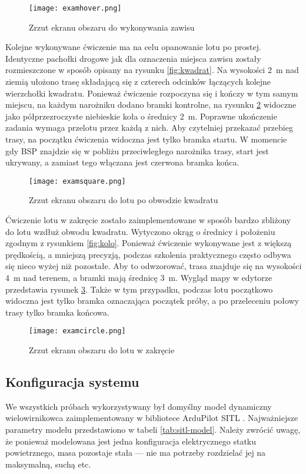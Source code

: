 \begin{figure}[!h]
    \centering \texttt{[image: examhover.png]}
    \caption{Zrzut ekranu obszaru do wykonywania zawisu}
    \label{fig:examhover}
\end{figure}

Kolejne wykonywane ćwiczenie ma na celu opanowanie lotu po prostej. Identyczne pachołki drogowe jak dla oznaczenia miejsca zawisu zostały rozmieszczone w sposób opisany na rysunku \ref{fig:kwadrat}. Na wysokości 2~m nad ziemią ułożono trasę składającą się z czterech odcinków łączących kolejne wierzchołki kwadratu. Ponieważ ćwiczenie rozpoczyna się i kończy w tym samym miejscu, na każdym narożniku dodano bramki kontrolne, na rysunku \ref{fig:examsquare} widoczne jako półprzezroczyste niebieskie koła o średnicy 2~m. Poprawne ukończenie zadania wymaga przelotu przez każdą z nich. Aby czytelniej przekazać przebieg trasy, na początku ćwiczenia widoczna jest tylko bramka startu. W momencie gdy BSP znajdzie się w pobliżu przeciwległego narożnika trasy, start jest ukrywany, a zamiast tego włączana jest czerwona bramka końca.

\begin{figure}[!h]
    \centering \texttt{[image: examsquare.png]}
    \caption{Zrzut ekranu obszaru do lotu po obwodzie kwadratu}
    \label{fig:examsquare}
\end{figure}

Ćwiczenie lotu w zakręcie zostało zaimplementowane w sposób bardzo zbliżony do lotu wzdłuż obwodu kwadratu. Wytyczono okrąg o średnicy i położeniu zgodnym z rysunkiem \ref{fig:kolo}. Ponieważ ćwiczenie wykonywane jest z większą prędkością, a mniejszą precyzją, podczas szkolenia praktycznego często odbywa się nieco wyżej niż pozostałe. Aby to odwzorować, trasa znajduje się na wysokości 4~m nad terenem, a bramki mają średnicę 3~m. Wygląd mapy w edytorze przedstawia rysunek \ref{fig:examcircle}. Także w tym przypadku, podczas lotu początkowo widoczna jest tylko bramka oznaczająca początek próby, a po przeleceniu połowy trasy tylko bramka końcowa.

\begin{figure}[!h]
    \centering \texttt{[image: examcircle.png]}
    \caption{Zrzut ekranu obszaru do lotu w zakręcie}
    \label{fig:examcircle}
\end{figure}

\subsection{Konfiguracja systemu}
We wszystkich próbach wykorzystywany był domyślny model dynamiczny wielowirnikowca zaimplementowany w bibliotece ArduPilot SITL \cite{sitl-model}. Najważniejsze parametry modelu przedstawiono w tabeli \ref{tab:sitl-model}. Należy zwrócić uwagę, że ponieważ modelowana jest jedna konfiguracja elektrycznego statku powietrznego, masa pozostaje stała --- nie ma potrzeby rozdzielać jej na maksymalną, suchą etc.

